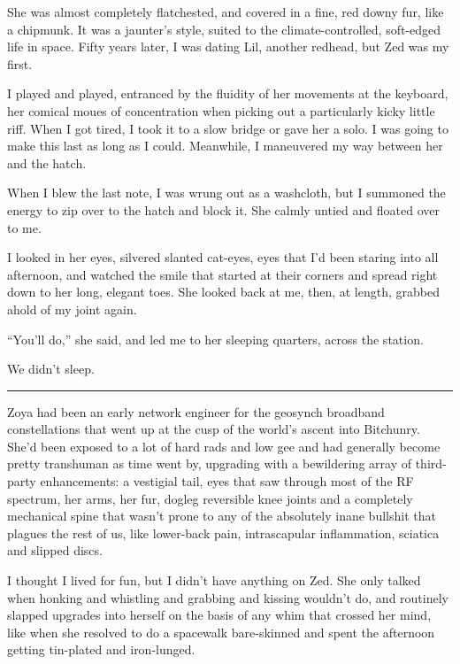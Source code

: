 She was almost completely flatchested, and covered in a fine, red
downy fur, like a chipmunk. It was a jaunter's style, suited to the
climate-controlled, soft-edged life in space. Fif\-ty years later, I
was dating Lil, another redhead, but Zed was my first.

I played and played, entranced by the fluidity of her movements at
the keyboard, her comical moues of concentration when picking out a
particularly kicky little riff. When I got tired, I took it to a
slow bridge or gave her a solo. I was going to make this last as
long as I could. Meanwhile, I maneuvered my way between her and the
hatch.

When I blew the last note, I was wrung out as a washcloth, but I
summoned the energy to zip over to the hatch and block it. She
calmly untied and floated over to me.

I looked in her eyes, silvered slanted cat-eyes, eyes that I'd been
staring into all afternoon, and watched the smile that started at
their corners and spread right down to her long, elegant toes. She
looked back at me, then, at length, grabbed ahold of my joint
again.

“You'll do,” she said, and led me to her sleeping quarters, across
the station.

We didn't sleep.

\begin{center}\rule{1in}{0.4pt}\end{center}

Zoya had been an early network engineer for the geosynch broadband
constellations that went up at the cusp of the world's ascent into
Bitchunry. She'd been exposed to a lot of hard rads and low gee and
had generally become pretty transhuman as time went by, upgrading
with a bewildering array of third-party enhancements: a vestigial
tail, eyes that saw through most of the RF spectrum, her arms, her
fur, dogleg reversible knee joints and a completely mechanical
spine that wasn't prone to any of the absolutely inane bullshit
that plagues the rest of us, like lower-back pain, intrascapular
inflammation, sciatica and slipped discs.

I thought I lived for fun, but I didn't have anything on Zed. She
only talked when honking and whistling and grabbing and kissing
wouldn't do, and routinely slapped upgrades into herself on the
basis of any whim that crossed her mind, like when she resolved to
do a spacewalk bare-skinned and spent the afternoon getting
tin-plated and iron-lunged.

